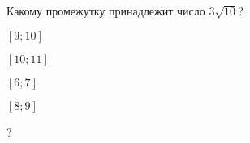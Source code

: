 \begin{ex}
	Какому промежутку принадлежит число $3\sqrt{10}$?
	
	\selectanswer
	\begin{enumcols}[columns=4]
		\item $[9;10]$
		\item $[10;11]$
		\item $[6;7]$
		\item $[8;9]$
	\end{enumcols}
	\begin{answer}
		?
	\end{answer}
\end{ex}